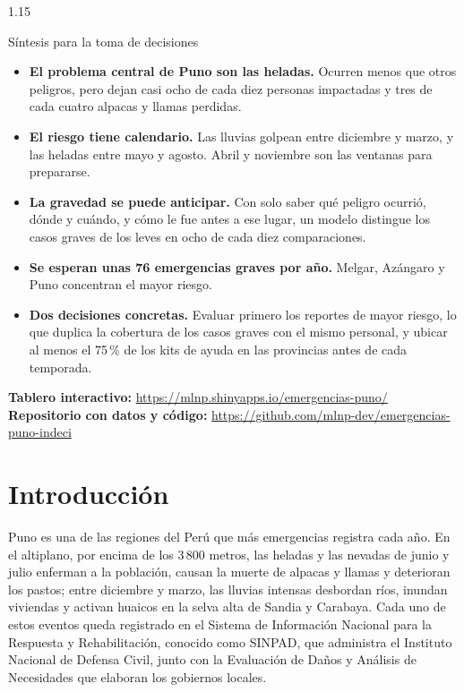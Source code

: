 \documentclass[12pt,a4paper]{article}
\begin{document}
\begin{spacing}{1.15}
\begin{sintesis}{Síntesis para la toma de decisiones}
\small{}
\begin{itemize}[leftmargin=14pt,itemsep=1pt,topsep=2pt]
\item \textbf{El problema central de Puno son las heladas.} Ocurren menos que otros peligros, pero dejan casi
ocho de cada diez personas impactadas y tres de cada cuatro alpacas y llamas perdidas.
\item \textbf{El riesgo tiene calendario.} Las lluvias golpean entre diciembre y marzo, y las heladas entre mayo y
agosto. Abril y noviembre son las ventanas para prepararse.
\item \textbf{La gravedad se puede anticipar.} Con solo saber qué peligro ocurrió, dónde y cuándo, y cómo le fue antes a
ese lugar, un modelo distingue los casos graves de los leves en ocho de cada diez comparaciones.
\item \textbf{Se esperan unas 76 emergencias graves por año.} Melgar, Azángaro y Puno concentran el mayor riesgo.
\item \textbf{Dos decisiones concretas.} Evaluar primero los reportes de mayor riesgo, lo que duplica la cobertura
de los casos graves con el mismo personal, y ubicar al menos el 75\,\% de los kits de ayuda en las provincias antes
de cada temporada.
\end{itemize}
\textbf{Tablero interactivo:} \url{https://mlnp.shinyapps.io/emergencias-puno/}\\
\textbf{Repositorio con datos y código:} \url{https://github.com/mlnp-dev/emergencias-puno-indeci}
\end{sintesis}
\end{spacing}

\clearpage
\section{Introducción}

Puno es una de las regiones del Perú que más emergencias registra cada año. En el altiplano, por encima de los
3\,800 metros, las heladas y las nevadas de junio y julio enferman a la población, causan la muerte de alpacas y
llamas y deterioran los pastos; entre diciembre y marzo, las lluvias intensas desbordan ríos, inundan viviendas y
activan huaicos en la selva alta de Sandia y Carabaya. Cada uno de estos eventos queda registrado en el Sistema de
Información Nacional para la Respuesta y Rehabilitación, conocido como SINPAD, que administra el Instituto Nacional
de Defensa Civil, junto con la Evaluación de Daños y Análisis de Necesidades que elaboran los gobiernos locales.
\end{document}
